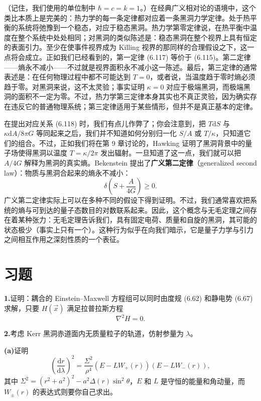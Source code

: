 
（记住，我们使用的单位制中 $\hbar=c=k=1$。）在经典广义相对论的语境中，这个类比本质上是完美的：热力学的每一条定律都对应着一条黑洞力学定律。处于热平衡的系统将弛豫到一个稳态，对应于稳态黑洞。热力学第零定律说，在热平衡中温度在整个系统中处处相同；对黑洞的类似陈述是：稳态黑洞在整个视界上具有恒定的表面引力。至少在使事件视界成为 Killing 视界的那同样的合理假设之下，这一点将会成立。正如我们已经看到的，第一定律 (6.117) 等价于 (6.115)。第二定律——熵永不减小——不过就是视界面积永不减小这一陈述。最后，第三定律的通常表述是：在任何物理过程中都不可能达到 $T=0$，或者说，当温度趋于零时熵必须趋于零。对黑洞来说，这不太灵验；事实证明 $\kappa=0$ 对应于极端黑洞，而极端黑洞的面积不一定为零。不过，热力学第三定律本身其实也不真正灵验，因为确实存在违反它的普通物理系统；第三定律适用于某些情形，但并不是真正基本的定律。

在提出对应关系 (6.118) 时，我们有点儿作弊了；你会注意到，把 $T\mathrm{d}S$ 与 $\kappa\mathrm{d}A/8\pi G$ 等同起来之后，我们并不知道如何分别归一化 $S/A$ 或 $T/\kappa$，只知道它们的组合。不过，正如我们将在第 9 章讨论的，Hawking 证明了黑洞背景中的量子场使得黑洞以温度 $T=\kappa/2\pi$ 发出辐射。一旦知道了这一点，我们就可以把 $A/4G$ 解释为黑洞的真实熵。Bekenstein 提出了\textbf{广义第二定律}（generalized second law）：物质与黑洞合起来的熵永不减小：
\begin{equation*}
\delta\left(S + \frac{A}{4G}\right) \geq 0.
\tag{6.119}
\end{equation*}
广义第二定律实际上可以在多种不同的假设下得到证明。不过，我们通常喜欢把系统的熵与可到达的量子态数目的对数联系起来。因此，这个概念与无毛定理之间存在着某种张力：无毛定理告诉我们，具有固定电荷、质量和自旋的黑洞，其可能的状态极少（事实上只有一个）。这种行为似乎在向我们暗示，它是量子力学与引力之间相互作用之深刻性质的一个表征。

\section{习题}

\textbf{1.}\quad 证明：耦合的 Einstein–Maxwell 方程组可以同时由度规 (6.62) 和静电势 (6.67) 求解，只要 $H(\vec{x})$ 满足拉普拉斯方程
\begin{equation*}
\nabla^{2}H = 0.
\tag{6.120}
\end{equation*}

\textbf{2.}\quad 考虑 Kerr 黑洞赤道面内无质量粒子的轨道，仿射参量为 $\lambda$。

\textbf{(a)}\quad 证明
\begin{equation*}
\left(\frac{\mathrm{d}r}{\mathrm{d}\lambda}\right)^{2} = \frac{\Sigma^{2}}{\rho^{4}}\left(E - LW_{+}(r)\right)\left(E - LW_{-}(r)\right),
\tag{6.121}
\end{equation*}
其中 $\Sigma^{2} = (r^{2}+a^{2})^{2} - a^{2}\Delta(r)\sin^{2}\theta$，$E$ 和 $L$ 是守恒的能量和角动量，而 $W_{\pm}(r)$ 的表达式则要你自己求出。

